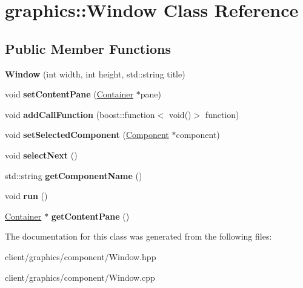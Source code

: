 \hypertarget{classgraphics_1_1_window}{\section{graphics\-:\-:Window Class Reference}
\label{classgraphics_1_1_window}
}
\subsection*{Public Member Functions}
\begin{DoxyCompactItemize}
\item 
\hypertarget{classgraphics_1_1_window_a6b0d8ee71a96e6a266f2aa1e44067207}{{\bfseries Window} (int width, int height, std\-::string title)}\label{classgraphics_1_1_window_a6b0d8ee71a96e6a266f2aa1e44067207}

\item 
\hypertarget{classgraphics_1_1_window_a0c8ee181d08a2ab44e309f3e72195624}{void {\bfseries set\-Content\-Pane} (\hyperlink{classgraphics_1_1_container}{Container} $\ast$pane)}\label{classgraphics_1_1_window_a0c8ee181d08a2ab44e309f3e72195624}

\item 
\hypertarget{classgraphics_1_1_window_a9e61d808951b14bdcb9d7aa12cf8543f}{void {\bfseries add\-Call\-Function} (boost\-::function$<$ void()$>$ function)}\label{classgraphics_1_1_window_a9e61d808951b14bdcb9d7aa12cf8543f}

\item 
\hypertarget{classgraphics_1_1_window_a83c05842186c6f4c959277c2a7975de3}{void {\bfseries set\-Selected\-Component} (\hyperlink{classgraphics_1_1_component}{Component} $\ast$component)}\label{classgraphics_1_1_window_a83c05842186c6f4c959277c2a7975de3}

\item 
\hypertarget{classgraphics_1_1_window_ad411d90f503bbf51afb57bb1e839d198}{void {\bfseries select\-Next} ()}\label{classgraphics_1_1_window_ad411d90f503bbf51afb57bb1e839d198}

\item 
\hypertarget{classgraphics_1_1_window_a1af6d1725fec953dc4c0001eaeb98333}{std\-::string {\bfseries get\-Component\-Name} ()}\label{classgraphics_1_1_window_a1af6d1725fec953dc4c0001eaeb98333}

\item 
\hypertarget{classgraphics_1_1_window_a8f340bc46477b864770074c5133be668}{void {\bfseries run} ()}\label{classgraphics_1_1_window_a8f340bc46477b864770074c5133be668}

\item 
\hypertarget{classgraphics_1_1_window_a5c3879079df57bdcdc408714386ef3d9}{\hyperlink{classgraphics_1_1_container}{Container} $\ast$ {\bfseries get\-Content\-Pane} ()}\label{classgraphics_1_1_window_a5c3879079df57bdcdc408714386ef3d9}

\end{DoxyCompactItemize}


The documentation for this class was generated from the following files\-:\begin{DoxyCompactItemize}
\item 
client/graphics/component/Window.\-hpp\item 
client/graphics/component/Window.\-cpp\end{DoxyCompactItemize}
